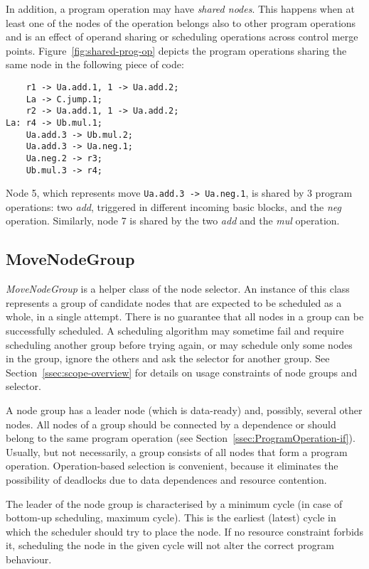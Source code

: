 \documentclass[a4paper,twoside]{tce}
\begin{document}
In addition, a program operation may have \emph{shared nodes}. This happens
when at least one of the nodes of the operation belongs also to other
program operations and is an effect of operand sharing or scheduling
operations across control merge points. Figure~\ref{fig:shared-prog-op}
depicts the program operations sharing the same node in the following piece
of code:
\begin{verbatim}
    r1 -> Ua.add.1, 1 -> Ua.add.2;
    La -> C.jump.1;
    r2 -> Ua.add.1, 1 -> Ua.add.2;
La: r4 -> Ub.mul.1;
    Ua.add.3 -> Ub.mul.2;
    Ua.add.3 -> Ua.neg.1;
    Ua.neg.2 -> r3;
    Ub.mul.3 -> r4;
\end{verbatim}
Node 5, which represents move \verb|Ua.add.3 -> Ua.neg.1|, is shared by 3
program operations: two \emph{add}, triggered in different incoming basic
blocks, and the \emph{neg} operation. Similarly, node 7 is shared by the two
\emph{add} and the \emph{mul} operation.

\subsection{MoveNodeGroup}

\emph{MoveNodeGroup} is a helper class of the node selector.
%
An instance of this class represents a group of candidate nodes that are
expected to be scheduled as a whole, in a single attempt. There is no
guarantee that all nodes in a group can be successfully scheduled. A
scheduling algorithm may sometime fail and require scheduling another group
before trying again, or may schedule only some nodes in the group, ignore
the others and ask the selector for another group. See
Section~\ref{ssec:scope-overview} for details on usage constraints of node
groups and selector.

A node group has a leader node (which is data-ready) and, possibly, several
other nodes. All nodes of a group should be connected by a dependence or
should belong to the same program operation (see
Section~\ref{ssec:ProgramOperation-if}). Usually, but not necessarily, a
group consists of all nodes that form a program operation. Operation-based
selection is convenient, because it eliminates the possibility of deadlocks
due to data dependences and resource contention.

The leader of the node group is characterised by a minimum cycle (in case of
bottom-up scheduling, maximum cycle). This is the earliest (latest) cycle in
which the scheduler should try to place the node. If no resource constraint
forbids it, scheduling the node in the given cycle will not alter the correct
program behaviour.
\end{document}
